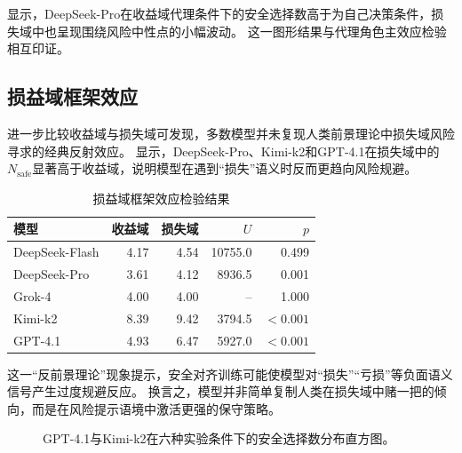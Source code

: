 \documentclass[journal]{vgtc}
\begin{document}
显示，DeepSeek-Pro在收益域代理条件下的安全选择数高于为自己决策条件，损失域中也呈现围绕风险中性点的小幅波动。
这一图形结果与代理角色主效应检验相互印证。

\subsection{损益域框架效应}

进一步比较收益域与损失域可发现，多数模型并未复现人类前景理论中损失域风险寻求的经典反射效应。
显示，DeepSeek-Pro、Kimi-k2和GPT-4.1在损失域中的$N_{\text{safe}}$显著高于收益域，说明模型在遇到“损失”语义时反而更趋向风险规避。

\begin{table}[tb]
  \caption{损益域框架效应检验结果}
  \label{tab:domain_effect}
  \centering
  \footnotesize
  \setlength{\tabcolsep}{4pt}
  \begin{tabular}{lrrrr}
    \toprule
    模型 & 收益域 & 损失域 & $U$ & $p$ \\
    \midrule
    DeepSeek-Flash & 4.17 & 4.54 & 10755.0 & 0.499 \\
    DeepSeek-Pro & 3.61 & 4.12 & 8936.5 & 0.001 \\
    Grok-4 & 4.00 & 4.00 & -- & 1.000 \\
    Kimi-k2 & 8.39 & 9.42 & 3794.5 & $<0.001$ \\
    GPT-4.1 & 4.93 & 6.47 & 5927.0 & $<0.001$ \\
    \bottomrule
  \end{tabular}
\end{table}

这一“反前景理论”现象提示，安全对齐训练可能使模型对“损失”“亏损”等负面语义信号产生过度规避反应。
换言之，模型并非简单复制人类在损失域中赌一把的倾向，而是在风险提示语境中激活更强的保守策略。

\begin{figure}[!htbp]
  \centering
  \begin{minipage}{0.98\linewidth}
    \centering
    
    \label{fig:gpt_distribution}
  \end{minipage}
  \vspace{0.3em}

  \begin{minipage}{0.98\linewidth}
    \centering
    
    \label{fig:kimi_distribution}
  \end{minipage}
  \caption{GPT-4.1与Kimi-k2在六种实验条件下的安全选择数分布直方图。}
  \label{fig:domain_distributions}
\end{figure}
\end{document}
